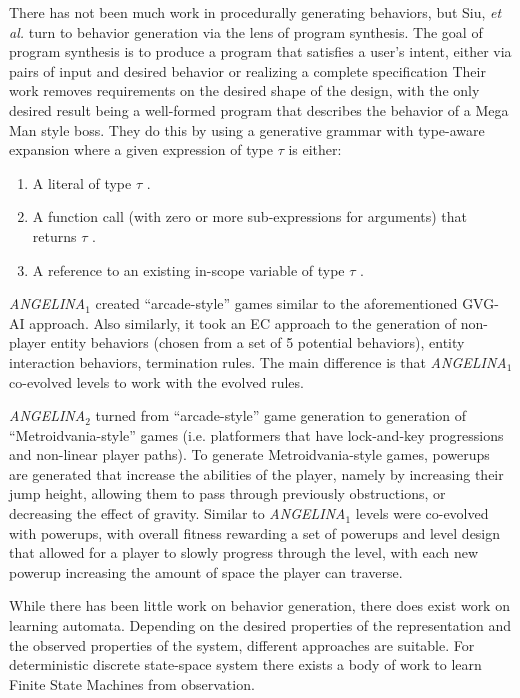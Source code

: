 \documentclass[12pt]{report}
\begin{document}
There has not been much work in procedurally generating behaviors, but Siu, \textit{et al.} \cite{programsynthesis} turn to behavior generation via the lens of program synthesis. The goal of program synthesis is to produce a program that satisfies a user's intent, either via pairs of input and desired behavior \cite{Oleksandr Polozov and Sumit Gulwani. 2015. FlashMeta: A framework for
inductive program synthesis} or realizing a complete specification \cite{Eric Schkufza, Rahul Sharma, and Alex Aiken. 2013. Stochastic Superoptimization.} Their work removes requirements on the desired shape of the design, with the only desired result being a well-formed program that describes the behavior of a Mega Man style boss.  They do this by using a generative grammar with type-aware expansion where a given expression of type $\tau$ is either:
\begin{enumerate}
\item A literal of type $\tau$ .
\item A function call (with zero or more sub-expressions for
arguments) that returns $\tau$ .
\item A reference to an existing in-scope variable of type $\tau$ .
\end{enumerate}

\textit{ANGELINA}$_{1}$ created ``arcade-style'' games similar to the aforementioned GVG-AI approach.  Also similarly, it took an EC approach to the generation of non-player entity behaviors (chosen from a set of 5 potential behaviors), entity interaction behaviors, termination rules. The main difference is that \textit{ANGELINA}$_{1}$  co-evolved levels to work with the evolved rules.

\textit{ANGELINA}$_{2}$ turned from ``arcade-style'' game generation to generation of ``Metroidvania-style'' games (i.e. platformers that 
have lock-and-key progressions and non-linear player paths).  To generate Metroidvania-style games, powerups are generated that increase the abilities of the player, namely by increasing their jump height, allowing them to pass through previously obstructions, or decreasing the effect of gravity.  Similar to \textit{ANGELINA}$_{1}$ levels were co-evolved with powerups, with overall fitness rewarding a set of powerups and level design that allowed for a player to slowly progress through the level, with each new powerup increasing the amount of space the player can traverse.

While there has been little work on behavior generation, there does exist work on learning automata. Depending on the desired properties of the representation and the observed properties of the system, different approaches are suitable.  For deterministic discrete state-space system there exists a body of work to learn Finite State Machines from observation.  
\end{document}
